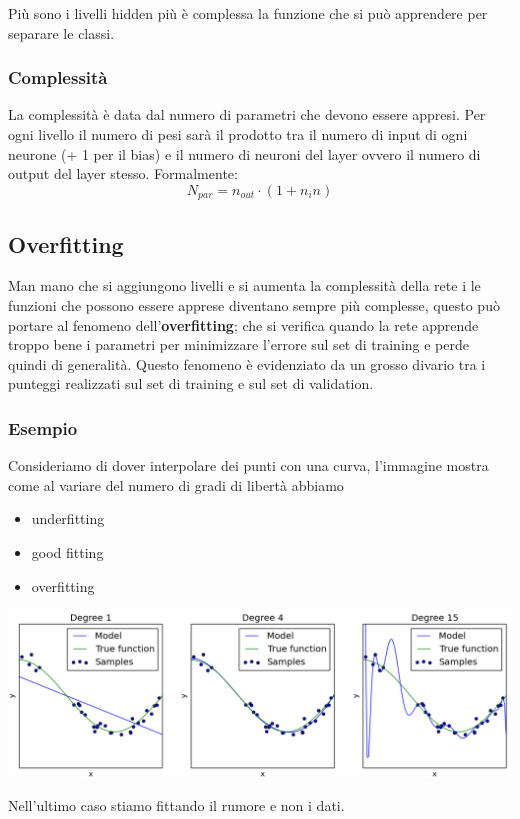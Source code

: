 Più sono i livelli hidden più è complessa la funzione che si può apprendere per separare le classi.
\subsubsection{Complessità}
La complessità è data dal numero di parametri che devono essere appresi. Per ogni livello il numero di pesi sarà il prodotto tra il numero di input di ogni neurone (+ 1 per il bias)  e il numero di neuroni del layer ovvero il numero di output del layer stesso. Formalmente:
\begin{equation}
	N_{par} = n_{out} \cdot (1+n_in)
\end{equation}

\subsection{Overfitting}
Man mano che si aggiungono livelli e si aumenta la complessità della rete i le funzioni che possono essere apprese diventano sempre più complesse, questo può portare al fenomeno dell'\textbf{overfitting}; che si verifica quando la rete apprende troppo bene i parametri per minimizzare l'errore sul set di training e perde quindi di generalità. Questo fenomeno è evidenziato da un grosso divario tra i punteggi realizzati sul set di training e sul set di validation.

\newpage
\subsubsection{Esempio}
Consideriamo di dover interpolare dei punti con una curva, l'immagine mostra come al variare del numero di gradi di libertà abbiamo 
\begin{multicols}{3}
	\begin{itemize}
		\item underfitting
		\item good fitting
		\item overfitting
	\end{itemize}
\end{multicols}
\begin{center}
	\includegraphics[width=\linewidth]{Picture/Overfitting}
\end{center}
Nell'ultimo caso stiamo fittando il rumore e non i dati.
